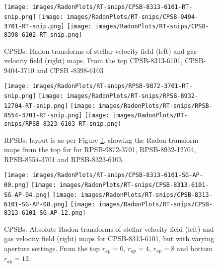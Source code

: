 

\begin{figure}
    \centering
    \texttt{[image: images/RadonPlots/RT-snips/CPSB-8313-6101-RT-snip.png]}
    \texttt{[image: images/RadonPlots/RT-snips/CPSB-9494-3701-RT-snip.png]}
    \texttt{[image: images/RadonPlots/RT-snips/CPSB-8398-6102-RT-snip.png]}
    \caption{CPSBs: Radon transforms of stellar velocity field (left) and gas velocity field (right) maps. From the top CPSB-8313-6101, CPSB-9404-3710 and CPSB -8398-6103}
    \label{fig:CPSB-RTs}
\end{figure}

\begin{figure}
    \centering
    \texttt{[image: images/RadonPlots/RT-snips/RPSB-9872-3701-RT-snip.png]}
    \texttt{[image: images/RadonPlots/RT-snips/RPSB-8932-12704-RT-snip.png]}
    \texttt{[image: images/RadonPlots/RT-snips/RPSB-8554-3701-RT-snip.png]}
    \texttt{[image: images/RadonPlots/RT-snips/RPSB-8323-6103-RT-snip.png]}
    \caption{RPSBs: layout is as per Figure \ref{fig:CPSB-RTs}, showing the Radon transform maps from the top for for RPSB-9872-3701, RPSB-8932-12704, RPSB-8554-3701 and RPSB-8323-6103.}
    \label{fig:RPSB-RTs}
\end{figure}

\begin{figure}
    \centering
    \texttt{[image: images/RadonPlots/RT-snips/CPSB-8313-6101-SG-AP-00.png]}
    \texttt{[image: images/RadonPlots/RT-snips/CPSB-8313-6101-SG-AP-04.png]}
    \texttt{[image: images/RadonPlots/RT-snips/CPSB-8313-6101-SG-AP-08.png]}
    \texttt{[image: images/RadonPlots/RT-snips/CPSB-8313-6101-SG-AP-12.png]}
    \caption{CPSBs: Absolute Radon transforms of stellar velocity field (left) and gas velocity field (right) maps for CPSB-8313-6101, but with varying aperture settings. From the top $r_{ap}=0$, $r_{ap}=4$, $r_{ap}=8$ and bottom $r_{ap}=12$.}
    \label{fig:CPSB-RT-Apertures}
\end{figure}
